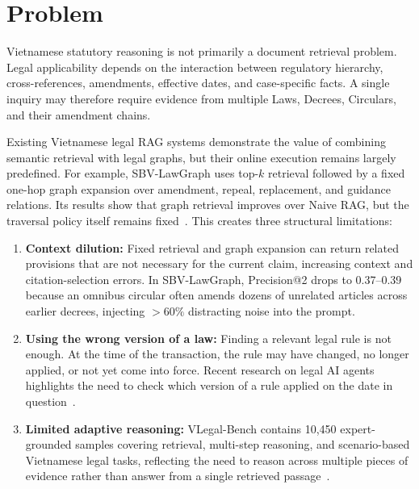 \section{Problem}

Vietnamese statutory reasoning is not primarily a document retrieval problem. Legal applicability depends on the interaction between regulatory hierarchy, cross-references, amendments, effective dates, and case-specific facts. A single inquiry may therefore require evidence from multiple Laws, Decrees, Circulars, and their amendment chains.

Existing Vietnamese legal RAG systems demonstrate the value of combining semantic retrieval with legal graphs, but their online execution remains largely predefined. For example, SBV-LawGraph uses top-$k$ retrieval followed by a fixed one-hop graph expansion over amendment, repeal, replacement, and guidance relations. Its results show that graph retrieval improves over Naive RAG, but the traversal policy itself remains fixed~\cite{phan2026sbvlawgraph}. This creates three structural limitations:

\begin{enumerate}
    \item \textbf{Context dilution:} Fixed retrieval and graph expansion can return related provisions that are not necessary for the current claim, increasing context and citation-selection errors. In SBV-LawGraph, Precision@2 drops to 0.37--0.39 because an omnibus circular often amends dozens of unrelated articles across earlier decrees, injecting $>60\%$ distracting noise into the prompt.

    \item \textbf{Using the wrong version of a law:} Finding a relevant legal rule is not enough. At the time of the transaction, the rule may have changed, no longer applied, or not yet come into force. Recent research on legal AI agents highlights the need to check which version of a rule applied on the date in question~\cite{fan2026timetravel}.

    \item \textbf{Limited adaptive reasoning:} VLegal-Bench contains 10,450 expert-grounded samples covering retrieval, multi-step reasoning, and scenario-based Vietnamese legal tasks, reflecting the need to reason across multiple pieces of evidence rather than answer from a single retrieved passage~\cite{nguyen2026vlegalbench}.
\end{enumerate}

